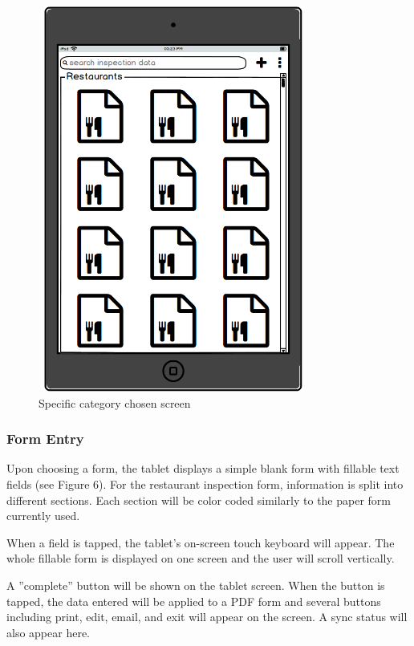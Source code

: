 \documentclass[twoside,letterpaper]{article}
\begin{document}
{\begin{figure}[H]
\centering
\includegraphics[width=3.5in,height=5in]{Specific_Category_Restaurants.png}
\caption{Specific category chosen screen}
\end{figure}
\newpage

\subsubsection[Form Entry]{\rmfamily\bfseries\color{black}
Form Entry}
Upon choosing a form, the tablet displays a simple blank form with fillable text fields (see Figure 6). For the restaurant inspection form, information is split into different sections. Each section will be color coded similarly to the paper form currently used.
\newline

\noindent When a field is tapped, the tablet's on-screen touch keyboard will appear. The whole fillable form is displayed on one screen and the user will scroll vertically. 
\newline

\noindent A ''complete'' button will be shown on the tablet screen. When the button is tapped, the data entered will be applied to a PDF form and several buttons including print, edit, email, and exit will appear on the screen. A sync status will also appear here.

}
\end{document}
